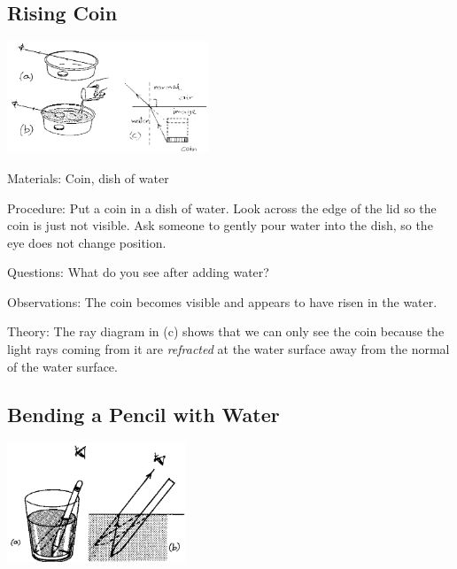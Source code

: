\begin{multicols}{2}
\subsection{Rising Coin}

\begin{center}
\includegraphics[width=0.45\textwidth]{./img/source/rising-coin.png}
\end{center}

\begin{description*}
\item[Materials:]{Coin, dish of water}
\item[Procedure:]{Put a coin in a dish of water. Look across the edge of the lid so the coin is just not visible. Ask someone to gently pour water into the dish, so the eye does not change position.}
\item[Questions:]{What do you see after adding water?}
\item[Observations:]{The coin becomes visible and appears to have risen in the water.}
\item[Theory:]{The ray diagram in (c) shows that we can only see the coin because the light rays coming from it are \emph{refracted} at the water surface away from the normal of the water surface.}
\end{description*}

\subsection{Bending a Pencil with Water}

\begin{center}
\includegraphics[width=0.4\textwidth]{./img/source/bending-pencil.png}
\end{center}


\end{multicols}
